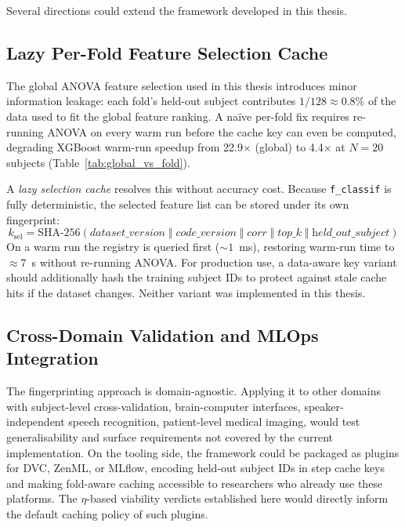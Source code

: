 Several directions could extend the framework developed in this thesis.

\subsection{Lazy Per-Fold Feature Selection Cache}
\label{sec:future_work}

The global ANOVA feature selection used in this thesis introduces minor
information leakage: each fold's held-out subject contributes
$1/128 \approx 0.8\%$ of the data used to fit the global feature ranking.
A na\"ive per-fold fix requires re-running ANOVA on every warm run before
the cache key can even be computed, degrading XGBoost warm-run speedup from
22.9$\times$ (global) to 4.4$\times$ at $N=20$ subjects
(Table~\ref{tab:global_vs_fold}).

A \textit{lazy selection cache} resolves this without accuracy cost.
Because \texttt{f\_classif} is fully deterministic, the selected feature list
can be stored under its own fingerprint:
%
\begin{equation*}
 k_{\text{sel}} = \text{SHA-256}\!\left(
 \textit{dataset\_version} \;\Vert\; \textit{code\_version} \;\Vert\;
 \textit{corr} \;\Vert\; \textit{top\_k} \;\Vert\;
 \textit{held\_out\_subject}
 \right)
\end{equation*}
%
On a warm run the registry is queried first (${\sim}1$~ms), restoring
warm-run time to ${\approx}7$~s without re-running ANOVA.
For production use, a data-aware key variant should additionally hash the
training subject IDs to protect against stale cache hits if the dataset
changes. Neither variant was implemented in this thesis.

\subsection{Cross-Domain Validation and MLOps Integration}

The fingerprinting approach is domain-agnostic. Applying it to other domains
with subject-level cross-validation, brain-computer interfaces,
speaker-independent speech recognition, patient-level medical imaging, 
would test generalisability and surface requirements not covered by the current
implementation. On the tooling side, the framework could be packaged as
plugins for DVC, ZenML, or MLflow, encoding held-out subject IDs in step
cache keys and making fold-aware caching accessible to researchers who already
use these platforms. The $\eta$-based viability verdicts established here
would directly inform the default caching policy of such plugins.

